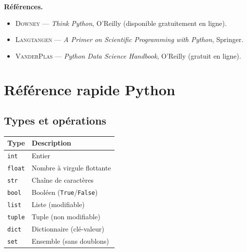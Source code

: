\documentclass[12pt,a4paper,twoside]{book}
\theoremstyle{definition}
\theoremstyle{remark}
\newcommand{\py}[1]{\texttt{#1}}
\begin{document}
\medskip
\textbf{R\'ef\'erences.}
\begin{itemize}
\item \textsc{Downey} --- \emph{Think Python}, O'Reilly (disponible gratuitement en ligne).
\item \textsc{Langtangen} --- \emph{A Primer on Scientific Programming with Python}, Springer.
\item \textsc{VanderPlas} --- \emph{Python Data Science Handbook}, O'Reilly (gratuit en ligne).
\end{itemize}

\mainmatter














\backmatter
\appendix
\chapter{R\'ef\'erence rapide Python}
\label{app:python}

\section{Types et op\'erations}
\begin{tabular}{ll}
\toprule
\textbf{Type} & \textbf{Description} \\
\midrule
\py{int} & Entier \\
\py{float} & Nombre \`a virgule flottante \\
\py{str} & Cha\^ine de caract\`eres \\
\py{bool} & Bool\'een (\py{True}/\py{False}) \\
\py{list} & Liste (modifiable) \\
\py{tuple} & Tuple (non modifiable) \\
\py{dict} & Dictionnaire (cl\'e-valeur) \\
\py{set} & Ensemble (sans doublons) \\
\bottomrule
\end{tabular}
\end{document}
